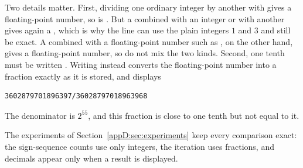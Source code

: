 Two details matter. First, dividing one ordinary integer by another with \code{/} gives a floating-point number, so  is . But a  combined with an integer or with another  gives again a , which is why the line  can use the plain integers $1$ and $3$ and still be exact. A  combined with a floating-point number such as , on the other hand, gives a floating-point number, so do not mix the two kinds. Second, one tenth must be written . Writing  instead converts the floating-point number  into a fraction exactly as it is stored, and  displays
\par\noindent\begin{minipage}{\linewidth}
\begin{lstlisting}
3602879701896397/36028797018963968
\end{lstlisting}
\end{minipage}\par
The denominator is $2^{55}$, and this fraction is close to one tenth but not equal to it.

The experiments of Section~\ref{appD:sec:experiments} keep every comparison exact: the sign-sequence counts use only integers, the iteration uses fractions, and decimals appear only when a result is displayed.

